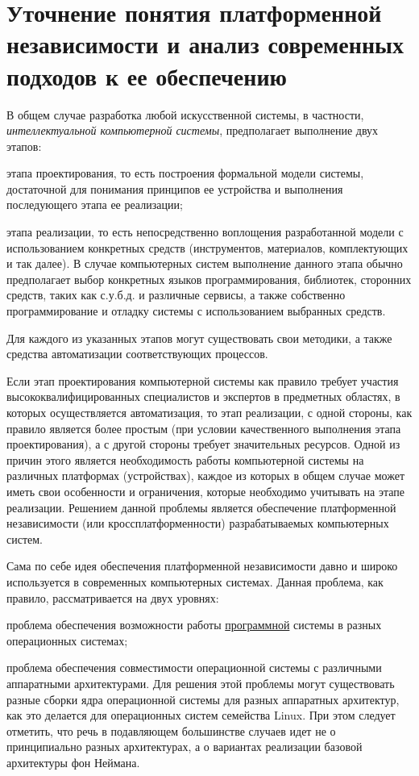 
\section{Уточнение понятия платформенной независимости и анализ современных подходов к ее обеспечению}
\label{sec_interpreter_analysis}

В общем случае разработка любой искусственной системы, в частности, \textit{интеллектуальной компьютерной системы}, предполагает выполнение двух этапов:
\begin{textitemize}
	\item этапа проектирования, то есть построения формальной модели системы, достаточной для понимания принципов ее устройства и выполнения последующего этапа ее реализации;
	\item этапа реализации, то есть непосредственно воплощения разработанной модели с использованием конкретных средств (инструментов, материалов, комплектующих и так далее). В случае компьютерных систем выполнение данного этапа обычно предполагает выбор конкретных языков программирования, библиотек, сторонних средств, таких как с.у.б.д. и различные сервисы, а также собственно программирование и отладку системы с использованием выбранных средств.
\end{textitemize}

Для каждого из указанных этапов могут существовать свои методики, а также средства автоматизации соответствующих процессов.

Если этап проектирования компьютерной системы как правило требует участия высококвалифицированных специалистов и экспертов в предметных областях, в которых осуществляется автоматизация, то этап реализации, с одной стороны, как правило является более простым (при условии качественного выполнения этапа проектирования), а с другой стороны требует значительных ресурсов. Одной из причин этого является необходимость работы компьютерной системы на различных платформах (устройствах), каждое из которых в общем случае может иметь свои особенности и ограничения, которые необходимо учитывать на этапе реализации. Решением данной проблемы является обеспечение платформенной независимости (или кроссплатформенности) разрабатываемых компьютерных систем.

Сама по себе идея обеспечения платформенной независимости давно и широко используется в современных компьютерных системах. Данная проблема, как правило, рассматривается на двух уровнях:
\begin{textitemize}
	\item проблема обеспечения возможности работы \uline{программной} системы в разных операционных системах;
	\item проблема обеспечения совместимости операционной системы с различными аппаратными архитектурами. Для решения этой проблемы могут существовать разные сборки ядра операционной системы для разных аппаратных архитектур, как это делается для операционных систем семейства Linux. При этом следует отметить, что речь в подавляющем большинстве случаев идет не о принципиально разных архитектурах, а о вариантах реализации базовой архитектуры фон Неймана.
\end{textitemize}

